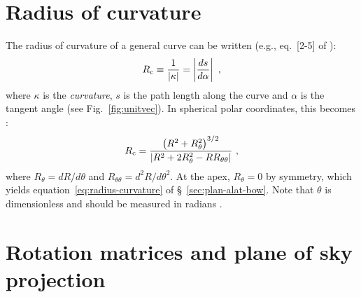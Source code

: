 
\section{Radius of curvature}
\label{sec:radius-curvature}

The radius of curvature of a general curve can be written (e.g.,
eq.~[2-5] of \citealp{Guggenheimer:2012a}):
\begin{equation}
  \label{eq:Rcurv-general}
  R_{\C} \equiv \frac{1}{\abs{\kappa}} = \Abs{\frac{d s}{d \alpha}} \ ,  
\end{equation}
where \(\kappa\) is the \textit{curvature}, \(s\) is the path length along
the curve and \(\alpha\) is the tangent angle (see Fig.~\ref{fig:unitvec}).
In spherical polar coordinates, this becomes \citep{Weisstein:2018a}:
\begin{equation}
  \label{eq:Rcurv-polar}
  R_{\mathrm{c}} = \frac{\left( R^2 + R_\theta^2 \right)^{3/2}}
  {\left\lvert R^2 + 2 R_\theta^2 - R R_{\theta\theta}\right\rvert} \ , 
\end{equation}
where \(R_\theta = d R / d \theta\) and
\(R_{\theta\theta} = d^2 R / d \theta^2\).  At the apex,
\(R_\theta = 0\) by symmetry, which yields
equation~\eqref{eq:radius-curvature} of
\S~\ref{sec:plan-alat-bow}. Note that \(\theta\) is dimensionless and
should be measured in radians \citep{Mohr:2015a, Quincey:2017a}.


\section{Rotation matrices and plane of sky projection}
\label{sec:plane-sky-projection}


